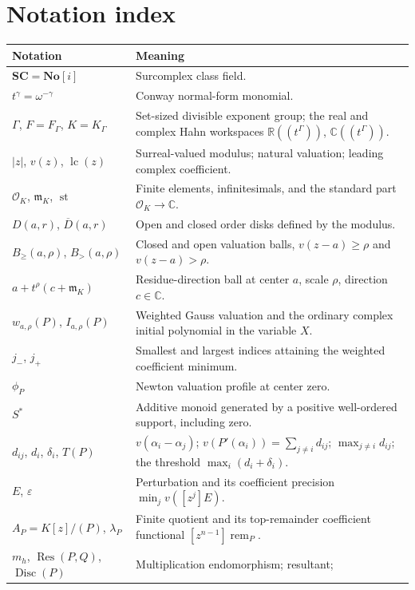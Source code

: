 \documentclass[11pt,letterpaper]{article}
\numberwithin{equation}{section}
\theoremstyle{definition}
\theoremstyle{remark}\newtheorem{remark}[theorem]{Remark}
\newcommand{\No}{\mathbf{No}}
\newcommand{\SC}{\mathbf{SC}}
\newcommand{\C}{\mathbb C}
\newcommand{\R}{\mathbb R}
\newcommand{\OO}{\mathcal O}
\newcommand{\mm}{\mathfrak m}
\newcommand{\st}{\operatorname{st}}
\newcommand{\Res}{\operatorname{Res}}
\newcommand{\Disc}{\operatorname{Disc}}
\newcommand{\lc}{\operatorname{lc}}
\newcommand{\rem}{\operatorname{rem}}
\newcommand{\Bge}[2]{B_{\ge}(#1,#2)}
\newcommand{\Bgt}[2]{B_{>}(#1,#2)}
\begin{document}
\section{Notation index}\label{polynomial:app:notation}
\begin{longtable}{@{}P{0.29\textwidth}P{0.63\textwidth}@{}}
\toprule
Notation & Meaning\\
\midrule
\endhead
$\SC=\No[i]$ & Surcomplex class field.\\[0.3em]
$t^\gamma=\omega^{-\gamma}$ & Conway normal-form monomial.\\[0.3em]
$\Gamma$, $F=F_\Gamma$, $K=K_\Gamma$ & Set-sized divisible exponent group; the
real and complex Hahn workspaces $\R((t^\Gamma))$, $\C((t^\Gamma))$.\\[0.3em]
$|z|$, $v(z)$, $\lc(z)$ & Surreal-valued modulus; natural valuation; leading
complex coefficient.\\[0.3em]
$\OO_K$, $\mm_K$, $\st$ & Finite elements, infinitesimals, and the standard
part $\OO_K\to\C$.\\[0.3em]
$D(a,r)$, $\overline D(a,r)$ & Open and closed order disks defined by the
modulus.\\[0.3em]
$\Bge a\rho$, $\Bgt a\rho$ & Closed and open valuation balls,
$v(z-a)\ge\rho$ and $v(z-a)>\rho$.\\[0.3em]
$a+t^\rho(c+\mm_K)$ & Residue-direction ball at center $a$, scale $\rho$,
direction $c\in\C$.\\[0.3em]
$w_{a,\rho}(P)$, $I_{a,\rho}(P)$ & Weighted Gauss valuation and the ordinary
complex initial polynomial in the variable $X$.\\[0.3em]
$j_-$, $j_+$ & Smallest and largest indices attaining the weighted coefficient
minimum.\\[0.3em]
$\phi_P$ & Newton valuation profile at center zero.\\[0.3em]
$S^*$ & Additive monoid generated by a positive well-ordered support,
including zero.\\[0.3em]
$d_{ij}$, $d_i$, $\delta_i$, $T(P)$ & $v(\alpha_i-\alpha_j)$;
$v(P'(\alpha_i))=\sum_{j\ne i}d_{ij}$; $\max_{j\ne i}d_{ij}$; the threshold
$\max_i(d_i+\delta_i)$.\\[0.3em]
$E$, $\varepsilon$ & Perturbation and its coefficient precision
$\min_jv([z^j]E)$.\\[0.3em]
$A_P=K[z]/(P)$, $\lambda_P$ & Finite quotient and its top-remainder
coefficient functional $[z^{n-1}]\rem_P$.\\[0.3em]
$m_h$, $\Res(P,Q)$, $\Disc(P)$ & Multiplication endomorphism; resultant;

\end{longtable}
\end{document}
